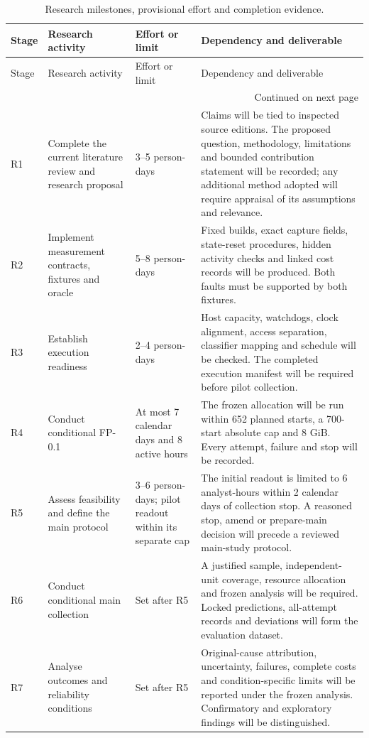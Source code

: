 \begin{longtable}{@{}p{}p{}p{}p{}@{}}
\caption{Research milestones, provisional effort and completion evidence.}\label{tab:work-sequence}\\
\toprule
Stage & Research activity & Effort or limit & Dependency and deliverable \\
\midrule
\endfirsthead
\toprule
Stage & Research activity & Effort or limit & Dependency and deliverable \\
\midrule
\endhead
\midrule
\multicolumn{4}{r}{\small Continued on next page}\\
\endfoot
\bottomrule
\endlastfoot
R1 & Complete the current literature review and research proposal & 3--5 person-days & Claims will be tied to inspected source editions. The proposed question, methodology, limitations and bounded contribution statement will be recorded; any additional method adopted will require appraisal of its assumptions and relevance. \\
R2 & Implement measurement contracts, fixtures and oracle & 5--8 person-days & Fixed builds, exact capture fields, state-reset procedures, hidden activity checks and linked cost records will be produced. Both faults must be supported by both fixtures. \\
R3 & Establish execution readiness & 2--4 person-days & Host capacity, watchdogs, clock alignment, access separation, classifier mapping and schedule will be checked. The completed execution manifest will be required before pilot collection. \\
R4 & Conduct conditional FP-0.1 & At most 7 calendar days and 8 active hours & The frozen allocation will be run within 652 planned starts, a 700-start absolute cap and 8 GiB. Every attempt, failure and stop will be recorded. \\
R5 & Assess feasibility and define the main protocol & 3--6 person-days; pilot readout within its separate cap & The initial readout is limited to 6 analyst-hours within 2 calendar days of collection stop. A reasoned stop, amend or prepare-main decision will precede a reviewed main-study protocol. \\
R6 & Conduct conditional main collection & Set after R5 & A justified sample, independent-unit coverage, resource allocation and frozen analysis will be required. Locked predictions, all-attempt records and deviations will form the evaluation dataset. \\
R7 & Analyse outcomes and reliability conditions & Set after R5 & Original-cause attribution, uncertainty, failures, complete costs and condition-specific limits will be reported under the frozen analysis. Confirmatory and exploratory findings will be distinguished. \\

\end{longtable}
